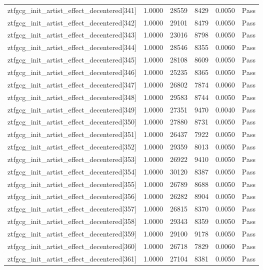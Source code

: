 \begin{table}[htbp]
\begin{tabular}{llrrll}
ztfgcg\_init\_artist\_effect\_decentered[341] & 1.0000 & 28559 & 8429 & 0.0050 & Pass \\
ztfgcg\_init\_artist\_effect\_decentered[342] & 1.0000 & 29101 & 8479 & 0.0050 & Pass \\
ztfgcg\_init\_artist\_effect\_decentered[343] & 1.0000 & 23016 & 8798 & 0.0050 & Pass \\
ztfgcg\_init\_artist\_effect\_decentered[344] & 1.0000 & 28546 & 8355 & 0.0060 & Pass \\
ztfgcg\_init\_artist\_effect\_decentered[345] & 1.0000 & 28108 & 8609 & 0.0050 & Pass \\
ztfgcg\_init\_artist\_effect\_decentered[346] & 1.0000 & 25235 & 8365 & 0.0050 & Pass \\
ztfgcg\_init\_artist\_effect\_decentered[347] & 1.0000 & 26802 & 7874 & 0.0060 & Pass \\
ztfgcg\_init\_artist\_effect\_decentered[348] & 1.0000 & 29583 & 8744 & 0.0050 & Pass \\
ztfgcg\_init\_artist\_effect\_decentered[349] & 1.0000 & 27351 & 9470 & 0.0040 & Pass \\
ztfgcg\_init\_artist\_effect\_decentered[350] & 1.0000 & 27880 & 8731 & 0.0050 & Pass \\
ztfgcg\_init\_artist\_effect\_decentered[351] & 1.0000 & 26437 & 7922 & 0.0050 & Pass \\
ztfgcg\_init\_artist\_effect\_decentered[352] & 1.0000 & 29359 & 8013 & 0.0050 & Pass \\
ztfgcg\_init\_artist\_effect\_decentered[353] & 1.0000 & 26922 & 9410 & 0.0050 & Pass \\
ztfgcg\_init\_artist\_effect\_decentered[354] & 1.0000 & 30120 & 8387 & 0.0050 & Pass \\
ztfgcg\_init\_artist\_effect\_decentered[355] & 1.0000 & 26789 & 8688 & 0.0050 & Pass \\
ztfgcg\_init\_artist\_effect\_decentered[356] & 1.0000 & 26282 & 8904 & 0.0050 & Pass \\
ztfgcg\_init\_artist\_effect\_decentered[357] & 1.0000 & 26815 & 8370 & 0.0050 & Pass \\
ztfgcg\_init\_artist\_effect\_decentered[358] & 1.0000 & 29343 & 8359 & 0.0050 & Pass \\
ztfgcg\_init\_artist\_effect\_decentered[359] & 1.0000 & 29100 & 9178 & 0.0050 & Pass \\
ztfgcg\_init\_artist\_effect\_decentered[360] & 1.0000 & 26718 & 7829 & 0.0060 & Pass \\
ztfgcg\_init\_artist\_effect\_decentered[361] & 1.0000 & 27104 & 8381 & 0.0050 & Pass \\

\end{tabular}
\end{table}
